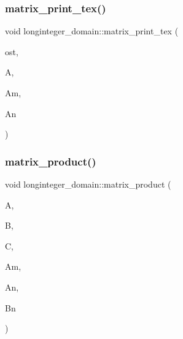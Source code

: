 \subsubsection{\texorpdfstring{matrix\+\_\+print\+\_\+tex()}{matrix\_print\_tex()}}
{\footnotesize\ttfamily void longinteger\+\_\+domain\+::matrix\+\_\+print\+\_\+tex (\begin{DoxyParamCaption}\item[{ostream \&}]{ost,  }\item[{\mbox{\hyperlink{classlonginteger__object}{longinteger\+\_\+object}} $\ast$}]{A,  }\item[{\mbox{\hyperlink{galois_8h_a09fddde158a3a20bd2dcadb609de11dc}{I\+NT}}}]{Am,  }\item[{\mbox{\hyperlink{galois_8h_a09fddde158a3a20bd2dcadb609de11dc}{I\+NT}}}]{An }\end{DoxyParamCaption})}

\mbox{\label{classlonginteger__domain_acf1267141342f981b53103794d1ee3d0}} 
\subsubsection{\texorpdfstring{matrix\+\_\+product()}{matrix\_product()}}
{\footnotesize\ttfamily void longinteger\+\_\+domain\+::matrix\+\_\+product (\begin{DoxyParamCaption}\item[{\mbox{\hyperlink{classlonginteger__object}{longinteger\+\_\+object}} $\ast$}]{A,  }\item[{\mbox{\hyperlink{classlonginteger__object}{longinteger\+\_\+object}} $\ast$}]{B,  }\item[{\mbox{\hyperlink{classlonginteger__object}{longinteger\+\_\+object}} $\ast$\&}]{C,  }\item[{\mbox{\hyperlink{galois_8h_a09fddde158a3a20bd2dcadb609de11dc}{I\+NT}}}]{Am,  }\item[{\mbox{\hyperlink{galois_8h_a09fddde158a3a20bd2dcadb609de11dc}{I\+NT}}}]{An,  }\item[{\mbox{\hyperlink{galois_8h_a09fddde158a3a20bd2dcadb609de11dc}{I\+NT}}}]{Bn }\end{DoxyParamCaption})}

\mbox{\label{classlonginteger__domain_aa89c03e0c2a1251a9d7d41ae129d0018}} 
